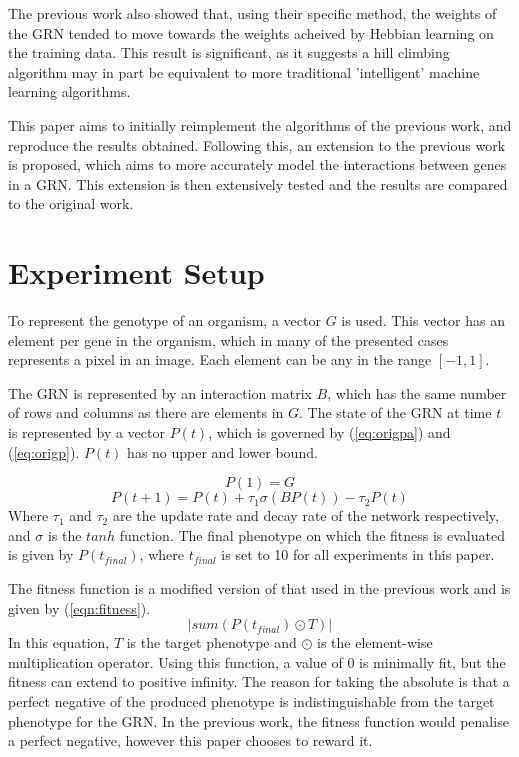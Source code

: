\documentclass[twocolumn,a4paper,12pt]{article}
\begin{document}
    The previous work also showed that, using their specific method, the weights of the GRN tended to move towards the weights acheived by Hebbian learning on the training data. This result is significant, as it suggests a hill climbing algorithm may in part be equivalent to more traditional 'intelligent' machine learning algorithms.

    This paper aims to initially reimplement the algorithms of the previous work, and reproduce the results obtained. Following this, an extension to the previous work is proposed, which aims to more accurately model the interactions between genes in a GRN. This extension is then extensively tested and the results are compared to the original work.

    \section{Experiment Setup}
    To represent the genotype of an organism, a vector $G$ is used. This vector has an element per gene in the organism, which in many of the presented cases represents a pixel in an image. Each element can be any in the range $[-1,1]$.

    The GRN is represented by an interaction matrix $B$, which has the same number of rows and columns as there are elements in $G$. The state of the GRN at time $t$ is represented by a vector $P(t)$, which is governed by (\ref{eq:origpa}) and (\ref{eq:origp}). $P(t)$ has no upper and lower bound.
    
    \begin{equation} \label{eq:origpa}
        P(1) = G
    \end{equation}
    \begin{equation} \label{eq:origp}
        P(t+1) = P(t) + \tau_1 \sigma (B P(t)) - \tau_2 P(t)
    \end{equation}
    Where $\tau_1$ and $\tau_2$ are the update rate and decay rate of the network respectively, and $\sigma$ is the $tanh$ function. The final phenotype on which the fitness is evaluated is given by $P(t_{final})$, where $t_{final}$ is set to 10 for all experiments in this paper.

    The fitness function is a modified version of that used in the previous work and is given by (\ref{eqn:fitness}).
    \begin{equation} \label{eqn:fitness}
        |{sum} (P(t_{final}) \odot T)|
    \end{equation}
    In this equation, $T$ is the target phenotype and $\odot$ is the element-wise multiplication operator. Using this function, a value of 0 is minimally fit, but the fitness can extend to positive infinity. The reason for taking the absolute is that a perfect negative of the produced phenotype is indistinguishable from the target phenotype for the GRN. In the previous work, the fitness function would penalise a perfect negative, however this paper chooses to reward it.
\end{document}
